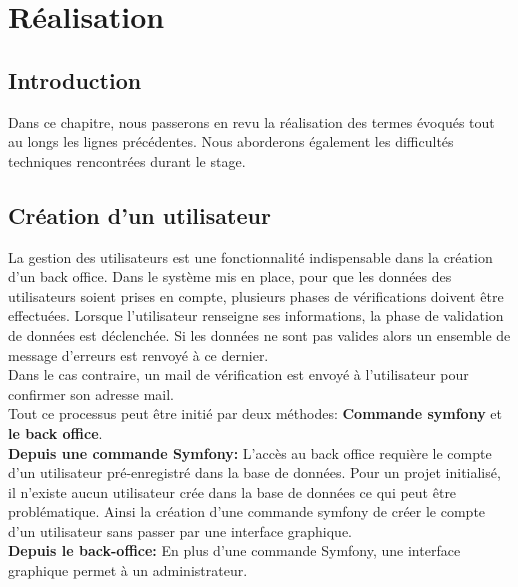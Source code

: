 \chapter{Réalisation}
	\section{Introduction}
		Dans ce chapitre, nous passerons en revu la réalisation des termes évoqués tout au longs les lignes précédentes. Nous aborderons également les difficultés techniques rencontrées durant le stage.
	\section{Création d'un utilisateur}
	La gestion des utilisateurs est une fonctionnalité indispensable dans la création d'un back office. Dans le système mis en place, pour que les données des utilisateurs soient prises en compte, plusieurs phases de vérifications doivent être effectuées. Lorsque l'utilisateur renseigne ses informations, la phase de validation de données est déclenchée. Si les données ne sont pas valides alors un ensemble de message d'erreurs est renvoyé à ce dernier.\\
	Dans le cas contraire, un mail de vérification est envoyé à l'utilisateur pour confirmer son adresse mail.\\
	Tout ce processus peut être initié par deux méthodes: \textbf{Commande symfony} et \textbf{le back office}.\\
	
		\textbf{Depuis une commande Symfony: } L'accès au back office requière le compte d'un utilisateur pré-enregistré dans la base de données.
			Pour un projet initialisé, il n'existe aucun utilisateur crée dans la base de données ce qui peut être problématique. Ainsi la création d'une commande symfony de créer le compte d'un utilisateur sans passer par une interface graphique.\\
			
		\textbf{Depuis le back-office: } En plus d'une commande Symfony, une interface graphique permet à un administrateur.

